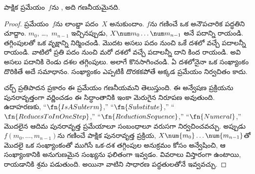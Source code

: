 \documentclass[../../../include/open-logic-section]{subfiles}
\begin{document}

\begin{thm}
పాక్షిక ప్రమేయం~$f$ను , అది గణనీయమైనది.
\end{thm}

\begin{proof}
ప్రమేయం~$f$ను లాంబ్డా పదం~$X$  అనుకుందాం.
$f$ను గణించే ఒక అనౌపచారిక పద్ధతిని చూద్దాం. $m_0$,
\dots,~$m_{n-1}$ ఇచ్చినప్పుడు, $X \num m_0 \ldots \num
m_{n-1}$ అనే పదాన్ని రాయండి. తగ్గింపులతో ఒక వృక్షాన్ని నిర్మించండి. మొదట అసలు పదం నుంచి ఒకే దశలో
వచ్చే పదాలన్నీ రాయండి. వాటిలో ప్రతి పదం నుంచి మరో దశలో వచ్చే
పదాలన్నీ దాని కింద రాయండి. అవి అసలు పదానికి రెండు దశల తగ్గింపులు.
అలాగే కొనసాగించండి. ఏ దశలోనైనా ఒక సంఖ్యాంకం దొరికితే అదే సమాధానం.
సంఖ్యాంకం ఎప్పటికీ దొరకకపోతే అక్కడ ప్రమేయం నిర్వచితం కాదు.

చర్చ్ ప్రతిపాదన ప్రకారం ఈ ప్రమేయం గణనీయమని తెలుస్తుంది.
ఈ అన్వేషణ ప్రక్రియను పునరావృత్తంగా వర్ణించడం ఈ సిద్ధాంతానికి
ఇంకా మెరుగైన నిరూపణ అవుతుంది. ఉదాహరణకు, ``$\fn{IsASubterm}$,''
``$\fn{Substitute}$,'' ``$\fn{ReducesToInOneStep}$,''
``$\fn{ReductionSequence}$,'' ``$\fn{Numeral}$,'' మొదలైన ఆదిమ
పునరావృత్త ప్రమేయాలూ సంబంధాలూ వరుసగా నిర్వచించవచ్చు. అప్పుడు
$f(m_0, \dots, m_{n-1})$ను గణించే పాక్షిక పునరావృత్త ప్రక్రియ,
$X \num{m_0} \dots \num{m_{n-1}}$తో మొదలై ఒక సంఖ్యాంకంతో ముగిసే
ఒక-దశ తగ్గింపుల అనుక్రమం కోసం అన్వేషించి, ఆ సంఖ్యాంకానికి అనుగుణమైన
సంఖ్యను ఫలితంగా ఇవ్వడం. వివరాలు విస్తారంగా ఉంటాయి, రాయడానికి శ్రమ పడుతుంది.
అయినా వాటిని సాధారణ పద్ధతులతోనే ఇవ్వవచ్చు.
\end{proof}
\end{document}
